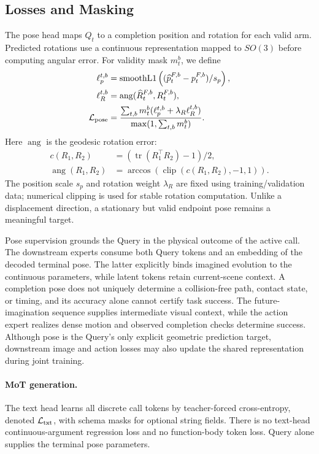 \subsection{Losses and Masking}
\label{app:losses}
The pose head maps $Q_t$ to a completion position and rotation for each valid arm. Predicted rotations use a continuous representation mapped to $SO(3)$ before computing angular error. For validity mask $m_t^b$, we define
\begin{align}
\ell_p^{t,b}&=\operatorname{smoothL1}
\left((\widehat p_t^{F,b}-p_t^{F,b})/s_p\right),\\
\ell_R^{t,b}&=\operatorname{ang}(\widehat R_t^{F,b},R_t^{F,b}),\\
\mathcal L_{\rm pose}&=
\frac{\sum_{t,b}m_t^b(\ell_p^{t,b}+\lambda_R\ell_R^{t,b})}
{\max(1,\sum_{t,b}m_t^b)}.
\label{eq:pose}
\end{align}
Here $\operatorname{ang}$ is the geodesic rotation error:
\begin{equation}
\begin{aligned}
c(R_1,R_2)&=(\operatorname{tr}(R_1^\top R_2)-1)/2,\\
\operatorname{ang}(R_1,R_2)&=\arccos(\operatorname{clip}(c(R_1,R_2),-1,1)).
\end{aligned}
\end{equation}
The position scale $s_p$ and rotation weight $\lambda_R$ are fixed using training/validation data; numerical clipping is used for stable rotation computation. Unlike a displacement direction, a stationary but valid endpoint pose remains a meaningful target.

Pose supervision grounds the Query in the physical outcome of the active call. The downstream experts consume both Query tokens and an embedding of the decoded terminal pose. The latter explicitly binds imagined evolution to the continuous parameters, while latent tokens retain current-scene context. A completion pose does not uniquely determine a collision-free path, contact state, or timing, and its accuracy alone cannot certify task success. The future-imagination sequence supplies intermediate visual context, while the action expert realizes dense motion and observed completion checks determine success. Although pose is the Query's only explicit geometric prediction target, downstream image and action losses may also update the shared representation during joint training.

\paragraph{MoT generation.}
The text head learns all discrete call tokens by teacher-forced cross-entropy, denoted $\mathcal L_{\rm txt}$, with schema masks for optional string fields. There is no text-head continuous-argument regression loss and no function-body token loss. Query alone supplies the terminal pose parameters.

